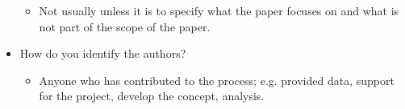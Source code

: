 \documentclass[12pt]{extarticle}
\begin{document}
\begin{itemize}
        \begin{itemize}
          \renewcommand\labelitemii{$\rightarrow$}
          \item Not usually unless it is to specify what the paper focuses on and what is not part of the scope of the paper.
        \end{itemize}
	\item How do you identify the authors?
        \begin{itemize}
          \renewcommand\labelitemii{$\rightarrow$}
          \item Anyone who has contributed to the process; e.g. provided data, support for the project, develop the concept, analysis.
        \end{itemize}
\end{itemize}
\end{document}
